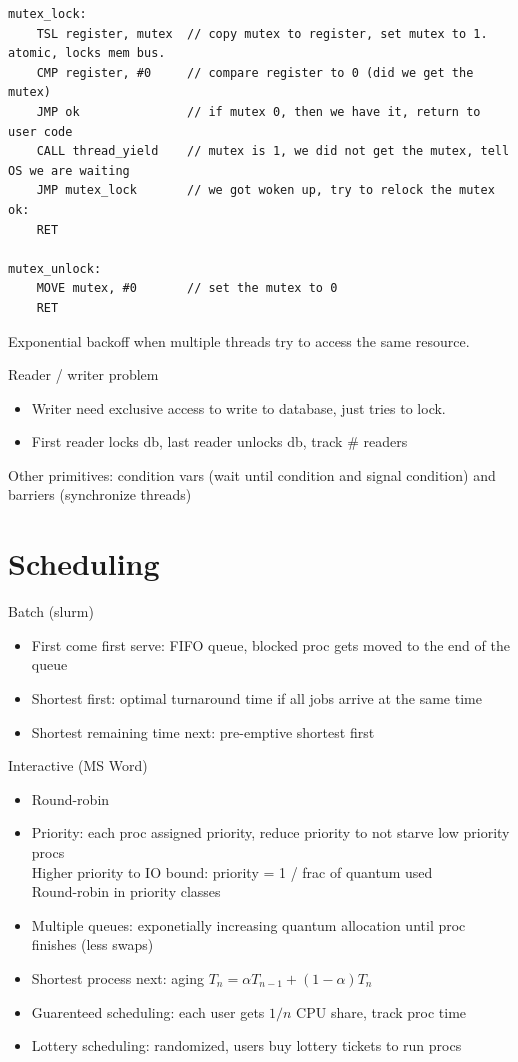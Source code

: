 \documentclass[10pt]{article}
\begin{document}
\begin{verbatim}
mutex_lock:
    TSL register, mutex  // copy mutex to register, set mutex to 1. atomic, locks mem bus.
    CMP register, #0     // compare register to 0 (did we get the mutex)
    JMP ok               // if mutex 0, then we have it, return to user code
    CALL thread_yield    // mutex is 1, we did not get the mutex, tell OS we are waiting
    JMP mutex_lock       // we got woken up, try to relock the mutex
ok:
    RET

mutex_unlock:
    MOVE mutex, #0       // set the mutex to 0
    RET
\end{verbatim}

Exponential backoff when multiple threads try to access the same resource.

Reader / writer problem
\begin{itemize}
    \item Writer need exclusive access to write to database, just tries to lock.
    \item First reader locks db, last reader unlocks db, track \# readers
\end{itemize}

Other primitives: condition vars (wait until condition and signal condition) and barriers (synchronize threads)


\section{Scheduling}
Batch (slurm)
\begin{itemize}
    \item First come first serve: FIFO queue, blocked proc gets moved to the end of the queue
    \item Shortest first: optimal turnaround time if all jobs arrive at the same time
    \item Shortest remaining time next: pre-emptive shortest first
\end{itemize}

Interactive (MS Word)
\begin{itemize}
    \item Round-robin
    \item Priority: each proc assigned priority, reduce priority to not starve low priority procs\\
        Higher priority to IO bound: priority = 1 / frac of quantum used\\
        Round-robin in priority classes
    \item Multiple queues: exponetially increasing quantum allocation until proc finishes (less swaps)
    \item Shortest process next: aging $T_n = \alpha T_{n-1} + (1-\alpha) T_{n}$
    \item Guarenteed scheduling: each user gets $1/n$ CPU share, track proc time
    \item Lottery scheduling: randomized, users buy lottery tickets to run procs
\end{itemize}
\end{document}
